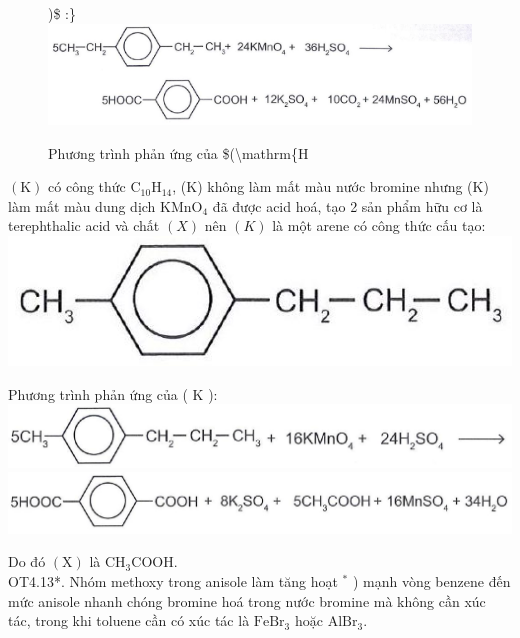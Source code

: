 \documentclass[10pt]{article}
\begin{document}
\begin{figure}[h]
\begin{center}
\captionsetup{labelformat=empty}
\caption{Phương trình phản ứng của \$(\textbackslash mathrm\{H})\$ :\}\\
  \includegraphics[width=\textwidth]{2025_10_23_adad5b98d65ac6665838g-30(6)}
\end{center}
\end{figure}

$(\mathrm{K})$ có công thức $\mathrm{C}_{10} \mathrm{H}_{14}$, (K) không làm mất màu nước bromine nhưng (K) làm mất màu dung dịch $\mathrm{KMnO}_{4}$ đã được acid hoá, tạo 2 sản phẩm hữu cơ là terephthalic acid và chất $(X)$ nên $(K)$ là một arene có công thức cấu tạo:\\
\includegraphics[max width=\textwidth, center]{2025_10_23_adad5b98d65ac6665838g-30(1)}

Phương trình phản ứng của ( K ):\\
\includegraphics[max width=\textwidth, center]{2025_10_23_adad5b98d65ac6665838g-30(3)}\\
\includegraphics[max width=\textwidth, center]{2025_10_23_adad5b98d65ac6665838g-30(4)}

Do đó $(\mathrm{X})$ là $\mathrm{CH}_{3} \mathrm{COOH}$.\\
OT4.13*. Nhóm methoxy trong anisole làm tăng hoạt ${ }^{*}$ ) mạnh vòng benzene đến mức anisole nhanh chóng bromine hoá trong nước bromine mà không cần xúc tác, trong khi toluene cần có xúc tác là $\mathrm{FeBr}_{3}$ hoặc $\mathrm{AlBr}_{3}$.
\end{document}
